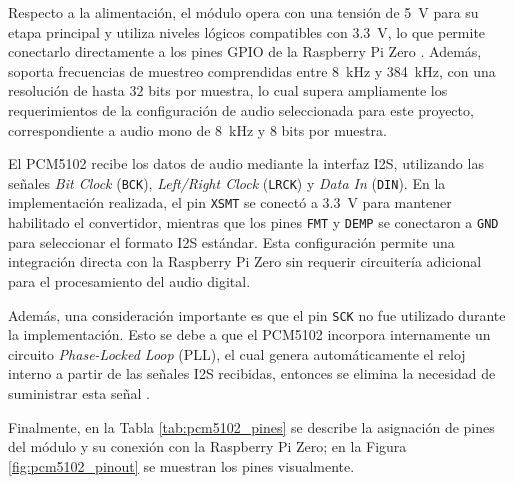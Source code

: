 Respecto a la alimentación, el módulo opera con una tensión de \SI{5}{\volt} para su etapa principal y utiliza niveles lógicos compatibles con \SI{3.3}{\volt}, lo que permite conectarlo directamente a los pines GPIO de la Raspberry Pi Zero \cite{pcm5102_datasheet}.
Además, soporta frecuencias de muestreo comprendidas entre \SI{8}{\kilo\hertz} y \SI{384}{\kilo\hertz}, con una resolución de hasta $32$ bits por muestra, lo cual supera ampliamente los requerimientos de la configuración de audio seleccionada para este proyecto, correspondiente a audio mono de \SI{8}{\kilo\hertz} y $8$ bits por muestra.

El PCM5102 recibe los datos de audio mediante la interfaz I2S, utilizando las señales \textit{Bit Clock} (\texttt{BCK}), \textit{Left/Right Clock} (\texttt{LRCK}) y \textit{Data In} (\texttt{DIN}).
En la implementación realizada, el pin \texttt{XSMT} se conectó a \SI{3.3}{\volt} para mantener habilitado el convertidor, mientras que los pines \texttt{FMT} y \texttt{DEMP} se conectaron a \texttt{GND} para seleccionar el formato I2S estándar.
Esta configuración permite una integración directa con la Raspberry Pi Zero sin requerir circuitería adicional para el procesamiento del audio digital.

Además, una consideración importante es que el pin \texttt{SCK} no fue utilizado durante la implementación.
Esto se debe a que el PCM5102 incorpora internamente un circuito \textit{Phase-Locked Loop} (PLL), el cual genera automáticamente el reloj interno a partir de las señales I2S recibidas, entonces se elimina la necesidad de suministrar esta señal \cite{pcm5102_datasheet}.

Finalmente, en la Tabla \ref{tab:pcm5102_pines} se describe la asignación de pines del módulo y su conexión con la Raspberry Pi Zero; en la Figura \ref{fig:pcm5102_pinout} se muestran los pines visualmente.

